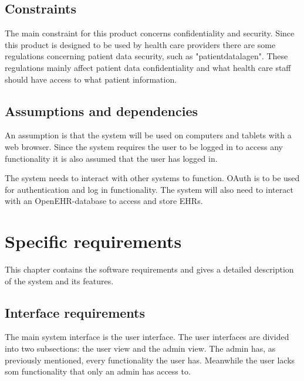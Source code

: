 \documentclass{scrreprt}
\begin{document}
\section{Constraints}
The main constraint for this product concerns confidentiality and security. Since this product is designed to be used by health care providers there are some regulations concerning patient data security, such as "patientdatalagen". These regulations mainly affect patient data confidentiality and what health care staff should have access to what patient information.

\section{Assumptions and dependencies}
An assumption is that the system will be used on computers and tablets with a web browser. Since the system requires the user to be logged in to access any functionality it is also assumed that the user has logged in.

The system needs to interact with other systems to function. OAuth is to be used for authentication and log in functionality. The system will also need to interact with an OpenEHR-database to access and store EHRs. 



\chapter{Specific requirements}
This chapter contains the software requirements and gives a detailed
description of the system and its features. 

\section{Interface requirements}
The main system interface is the user interface. The user interfaces are divided into two subsections: the user view and the admin view. The admin has, as previously mentioned, every functionality the user has. Meanwhile the user lacks som functionality that only an admin has access to. 
\end{document}
